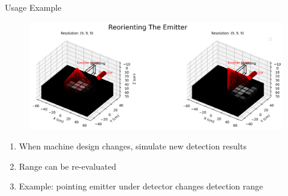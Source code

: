 \documentclass[10pt,hyperref={colorlinks,citecolor=blue,urlcolor=peking_blue,linkcolor=}]{beamer}
\theoremstyle{plain}
\begin{document}
\begin{frame}{Usage Example}
\begin{figure}[Detector Direction to Measured Density]
\begin{center}
\includegraphics[width=1\linewidth]{../Figures/MCNP/DetectorDirectiontoMeasuredDensity.png}
\end{center}
\end{figure}
\begin{enumerate}
\item When machine design changes, simulate new detection results
\item Range can be re-evaluated
\item Example: pointing emitter under detector changes detection range
\end{enumerate}
\end{frame}
\end{document}
